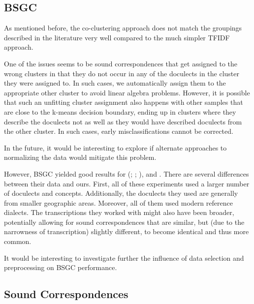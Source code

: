 \documentclass[a4paper]{article}
\begin{document}

\subsection{BSGC}

As mentioned before, the co-clustering approach
does not match the groupings described in the literature very well
compared to the much simpler TFIDF approach.

One of the issues seems to be
sound correspondences that get assigned to the wrong clusters
in that they do not occur in any of the doculects in the cluster
they were assigned to.
In such cases, we automatically assign them to the appropriate
other cluster to avoid linear algebra problems.
However, it is possible that such an unfitting
cluster assignment also happens with other samples
that are close to the k-means decision boundary,
ending up in clusters where they describe the doculects
not as well as they would have described doculects from the other cluster.
In such cases, early misclassifications cannot be corrected.

In the future, it would be interesting to
explore if alternate approaches to normalizing the data
would mitigate this problem.

However, BSGC yielded good results for \citeauthor{wieling2011bipartite}
(\citeyear{wieling2009bipartite}; \citeyear{wieling2010hierarchical}; \citeyear{wieling2011bipartite}),
\citet{wieling2013analyzing} and \citet{montemagni2013synchronic}.
There are several differences between their data and ours.
First, all of these experiments used a larger number
of doculects and concepts.
Additionally, the doculects they used are
generally from smaller geographic areas.
Moreover, all of them used modern reference dialects.
The transcriptions they worked with might also have been broader,
potentially allowing for sound correspondences that are similar,
but (due to the narrowness of transcription) slightly different,
to become identical and thus more common.

It would be interesting to investigate further the influence of
data selection and preprocessing on BSGC performance.

\subsection{Sound Correspondences}
\end{document}
